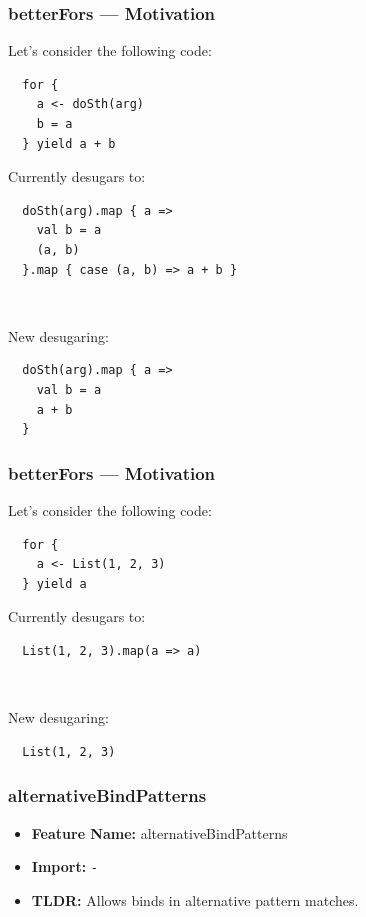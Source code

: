 \documentclass{beamer}
\begin{document}
\begin{frame}[fragile]
  \frametitle{betterFors --- Motivation}
  
  Let's consider the following code:

  \begin{lstlisting}
  for {
    a <- doSth(arg)
    b = a
  } yield a + b
  \end{lstlisting}

  Currently desugars to:

  \begin{lstlisting}
  doSth(arg).map { a =>
    val b = a
    (a, b)
  }.map { case (a, b) => a + b }
  \end{lstlisting}

  \pause\

  New desugaring:

  \begin{lstlisting}
  doSth(arg).map { a =>
    val b = a
    a + b
  }
  \end{lstlisting}

\end{frame}

\begin{frame}[fragile]
  \frametitle{betterFors --- Motivation}
  
  Let's consider the following code:

  \begin{lstlisting}
  for {
    a <- List(1, 2, 3)
  } yield a
  \end{lstlisting}

  Currently desugars to:

  \begin{lstlisting}
  List(1, 2, 3).map(a => a)
  \end{lstlisting}

  \pause\

  New desugaring:

  \begin{lstlisting}
  List(1, 2, 3)
  \end{lstlisting}

\end{frame}

\begin{frame}[fragile]
  \frametitle{alternativeBindPatterns}
  \begin{itemize}
    \item \textbf{Feature Name:} alternativeBindPatterns
    \item \textbf{Import:} \texttt{-}
    \item \textbf{TLDR:} Allows binds in alternative pattern matches.
  \end{itemize}
\end{frame}
\end{document}

